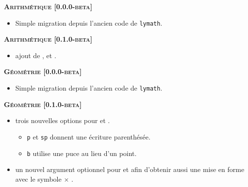 \separation




\begin{center}
    \textbf{\textsc{Arithmétique [0.0.0-beta]}}
\end{center}

\begin{itemize}[itemsep=.5em]
    \item Simple migration depuis l'ancien code de \verb+lymath+.
\end{itemize}


\begin{center}
    \textbf{\textsc{Arithmétique [0.1.0-beta]}}
\end{center}

\begin{itemize}[itemsep=.5em]
    \item {} ajout de ,  et .
\end{itemize}


\separation




\begin{center}
    \textbf{\textsc{Géométrie [0.0.0-beta]}}
\end{center}

\begin{itemize}[itemsep=.5em]
    \item Simple migration depuis l'ancien code de \verb+lymath+.
\end{itemize}


\begin{center}
    \textbf{\textsc{Géométrie [0.1.0-beta]}}
\end{center}

\begin{itemize}[itemsep=.5em]
    \item {}
          trois nouvelles options pour  et .
    \begin{itemize}[itemsep=.5em]
        \item \verb+p+ et \verb+sp+ donnent une écriture parenthésée.

        \item \verb+b+ utilise une puce au lieu d'un point.
    \end{itemize}


	


    \item {}
          un nouvel argument optionnel pour  et  afin d'obtenir aussi une mise en forme avec le symbole $\times$ .


    
\end{itemize}


